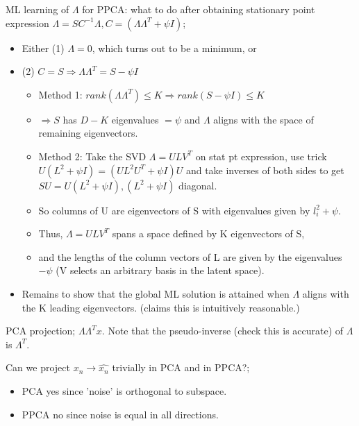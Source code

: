 \documentclass{article}
\begin{document}
ML learning of $\Lambda$ for PPCA: what to do after obtaining stationary point expression $\Lambda = SC^{-1}\Lambda, C=(\Lambda\Lambda^T+\psi I)$; \begin{itemize} \item Either (1) $\Lambda=0$, which turns out to be a minimum, or \item (2) $C=S \Rightarrow \Lambda\Lambda^T=S-\psi I$ \begin{itemize} \item Method 1: $rank(\Lambda\Lambda^T)\leq K\Rightarrow rank(S-\psi I) \leq K$ \item $\Rightarrow S$ has $D-K$ eigenvalues $=\psi$ and $\Lambda$ aligns with the space of remaining eigenvectors.  \item Method 2: Take the SVD $\Lambda = ULV^T$ on stat pt expression, use trick $U(L^2+\psi I)=(UL^2U^T+\psi I)U$ and take inverses of both sides to get $SU=U(L^2+\psi I), (L^2+\psi I)$ diagonal.  \item So columns of U are eigenvectors of S with eigenvalues given by $l^2_i + \psi$.  \item Thus, $\Lambda = ULV^T$ spans a space defined by K eigenvectors of S, \item and the lengths of the column vectors of L are given by the eigenvalues $-\psi$ (V selects an arbitrary basis in the latent space).  \end{itemize} \item Remains to show that the global ML solution is attained when $\Lambda$ aligns with the K leading eigenvectors. (claims this is intuitively reasonable.) \end{itemize}

PCA projection; $\Lambda\Lambda^Tx$. Note that the pseudo-inverse (check this is accurate) of $\Lambda$ is $\Lambda^T$.

Can we project $x_n \rightarrow \hat{x_n}$ trivially in PCA and in PPCA?; \begin{itemize} \item PCA yes since 'noise' is orthogonal to subspace.  \item PPCA no since noise is equal in all directions.  \end{itemize} 
\end{document}
